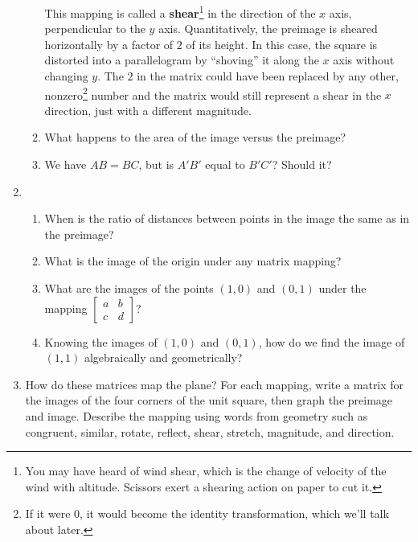 \documentclass[../textbook.tex]{subfiles}
\begin{document}
\begin{enumerate}
\begin{enumerate}
This mapping is called a \textbf{shear}\footnote{You may have heard of wind shear, which is the change of velocity of the wind with altitude. Scissors exert a shearing action on paper to cut it.} in the direction of the $x$ axis, perpendicular to the $y$ axis. Quantitatively, the preimage is sheared horizontally by a factor of $2$ of its height. In this case, the square is distorted into a parallelogram by ``shoving'' it along the $x$ axis without changing $y$. The $2$ in the matrix could have been replaced by any other, nonzero\footnote{If it were $0$, it would become the identity transformation, which we'll talk about later.} number and the matrix would still represent a shear in the $x$ direction, just with a different magnitude.
\item What happens to the area of the image versus the preimage?
\item We have $AB=BC$, but is $A'B'$ equal to $B'C'$? Should it?
\end{enumerate}
\item \begin{enumerate}
\item When is the ratio of distances between points in the image the same as in the preimage?
\item What is the image of the origin under any matrix mapping?
\item What are the images of the points $(1,0)$ and $(0,1)$ under the mapping $\left[\begin{array}{cc} a & b \\ c & d \end{array}\right]$?
\item Knowing the images of $(1,0)$ and $(0,1)$, how do we find the image of $(1,1)$ algebraically and geometrically?
\end{enumerate}
\item How do these matrices map the plane? For each mapping, write a matrix for the images of the four corners of the unit square, then graph the preimage and image. Describe the mapping using words from geometry such as congruent, similar, rotate, reflect, shear, stretch, magnitude, and direction. \label{prob:map_plane_sixteen_matrices}
\begin{enumerate}
\end{enumerate}
\end{enumerate}
\end{document}
